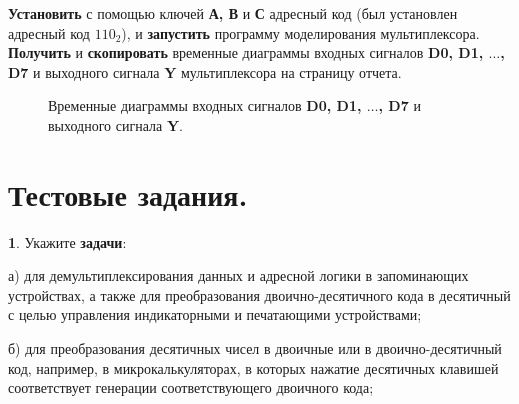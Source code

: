 \documentclass[spec, och, otchet, hidelinks]{SCWorks}
\begin{document}
\newpage

\textbf{Установить} с помощью ключей \textbf{А, В} и \textbf{С} адресный код (был установлен 
адресный код $ 110_2 $), и \textbf{запустить} программу моделирования мультиплексора. 
\textbf{Получить} и \textbf{скопировать} временные диаграммы входных сигналов 
\textbf{D0, D1, $ \dots $, D7} и выходного сигнала \textbf{Y} мультиплексора на страницу отчета.

\begin{figure}[h]
	\caption{Временные диаграммы входных сигналов \textbf{D0, D1, $ \dots $, D7} и выходного сигнала 
		\textbf{Y}.}
\end{figure}

\newpage

\section*{Тестовые задания.}

\par \textbf{1}. Укажите \textbf{задачи}:
\par а) для демультиплексирования данных и адресной логики в запоминающих устройствах, а также для 
преобразования двоично-десятичного кода в десятичный с целью управления индикаторными и печатающими 
устройствами;

\par б) для преобразования десятичных чисел в двоичные или в двоично-десятичный код, например, в 
микрокалькуляторах, в которых нажатие десятичных клавишей соответствует генерации соответствующего 
двоичного кода;
\end{document}
